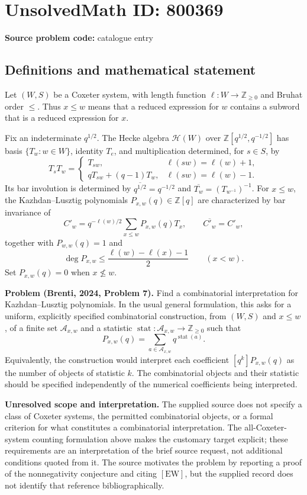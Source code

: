 \documentclass[11pt]{article}
\newcommand{\Z}{\mathbb{Z}}
\begin{document}
\section*{UnsolvedMath ID: 800369}
\textbf{Source problem code:} catalogue entry
\subsection{Definitions and mathematical statement}
Let \((W,S)\) be a Coxeter system, with length function \(\ell:W\to\Z_{\geq 0}\) and Bruhat order \(\leq\). Thus \(x\leq w\) means that a reduced expression for \(w\) contains a subword that is a reduced expression for \(x\).

Fix an indeterminate \(q^{1/2}\). The Hecke algebra \(\mathcal H(W)\) over \(\Z[q^{1/2},q^{-1/2}]\) has basis \(\{T_w:w\in W\}\), identity \(T_e\), and multiplication determined, for \(s\in S\), by
\[
T_sT_w=\begin{cases}
T_{sw},&\ell(sw)=\ell(w)+1,\\
qT_{sw}+(q-1)T_w,&\ell(sw)=\ell(w)-1.
\end{cases}
\]
Its bar involution is determined by \(\overline{q^{1/2}}=q^{-1/2}\) and \(\overline{T_w}=(T_{w^{-1}})^{-1}\). For \(x\leq w\), the Kazhdan--Lusztig polynomials \(P_{x,w}(q)\in\Z[q]\) are characterized by bar invariance of
\[
C'_w=q^{-\ell(w)/2}\sum_{x\leq w}P_{x,w}(q)T_x,
\qquad \overline{C'_w}=C'_w,
\]
together with \(P_{w,w}(q)=1\) and
\[
\deg P_{x,w}\leq\frac{\ell(w)-\ell(x)-1}{2}\qquad(x<w).
\]
Set \(P_{x,w}(q)=0\) when \(x\not\leq w\).

\textbf{Problem (Brenti, 2024, Problem 7).} Find a combinatorial interpretation for Kazhdan--Lusztig polynomials. In the usual general formulation, this asks for a uniform, explicitly specified combinatorial construction, from \((W,S)\) and \(x\leq w\), of a finite set \(\mathcal A_{x,w}\) and a statistic \(\operatorname{stat}:\mathcal A_{x,w}\to\Z_{\geq0}\) such that
\[
P_{x,w}(q)=\sum_{a\in\mathcal A_{x,w}}q^{\operatorname{stat}(a)}.
\]
Equivalently, the construction would interpret each coefficient \([q^k]P_{x,w}(q)\) as the number of objects of statistic \(k\). The combinatorial objects and their statistic should be specified independently of the numerical coefficients being interpreted.

\textbf{Unresolved scope and interpretation.} The supplied source does not specify a class of Coxeter systems, the permitted combinatorial objects, or a formal criterion for what constitutes a combinatorial interpretation. The all-Coxeter-system counting formulation above makes the customary target explicit; these requirements are an interpretation of the brief source request, not additional conditions quoted from it. The source motivates the problem by reporting a proof of the nonnegativity conjecture and citing \([\mathrm{EW}]\), but the supplied record does not identify that reference bibliographically.
\end{document}
